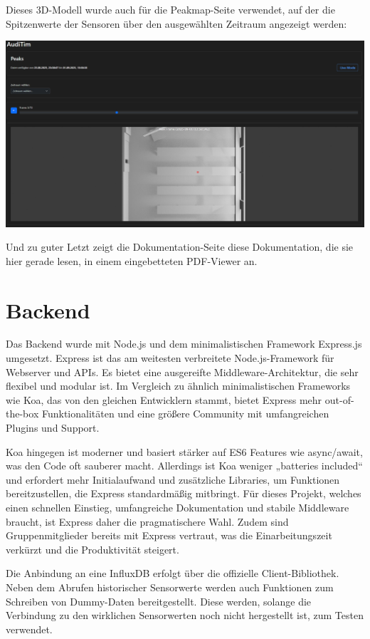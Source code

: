 Dieses 3D-Modell wurde auch für die Peakmap-Seite verwendet, auf der die Spitzenwerte der Sensoren über den ausgewählten Zeitraum angezeigt werden:
\begin{center}
  \includegraphics[width=1\textwidth]{../images/UI/peak.png}
\end{center}

Und zu guter Letzt zeigt die Dokumentation-Seite diese Dokumentation, die sie hier gerade lesen, in einem eingebetteten PDF-Viewer an. 

\section{Backend}
Das Backend wurde mit Node.js und dem minimalistischen Framework Express.js umgesetzt. 
Express ist das am weitesten verbreitete Node.js-Framework für Webserver und APIs. 
Es bietet eine ausgereifte Middleware-Architektur, die sehr flexibel und modular ist. 
Im Vergleich zu ähnlich minimalistischen Frameworks wie Koa, 
das von den gleichen Entwicklern stammt, 
bietet Express mehr out-of-the-box Funktionalitäten und eine größere Community mit umfangreichen Plugins und Support. \cite{betterstack2025koavsexpress,appventurez2025nodejsframework}

Koa hingegen ist moderner und basiert stärker auf ES6 Features wie async/await, was den Code oft sauberer macht. 
Allerdings ist Koa weniger „batteries included“ und erfordert mehr Initialaufwand und zusätzliche Libraries, 
um Funktionen bereitzustellen, die Express standardmäßig mitbringt. 
Für dieses Projekt, welches einen schnellen Einstieg, umfangreiche Dokumentation und stabile Middleware braucht, 
ist Express daher die pragmatischere Wahl.
Zudem sind Gruppenmitglieder bereits mit Express vertraut, was die Einarbeitungszeit verkürzt und die Produktivität steigert. 

Die Anbindung an eine InfluxDB erfolgt über die offizielle Client-Bibliothek. 
Neben dem Abrufen historischer Sensorwerte werden auch Funktionen zum Schreiben von Dummy-Daten bereitgestellt.
Diese werden, solange die Verbindung zu den wirklichen Sensorwerten noch nicht hergestellt ist, zum Testen verwendet.

